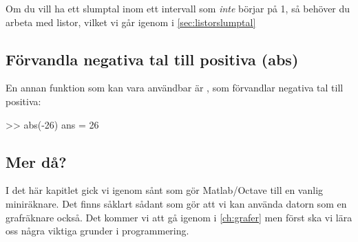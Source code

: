 Om du vill ha ett slumptal inom ett intervall som \emph{inte} börjar på 1, så behöver du arbeta med listor, vilket vi går igenom i \autoref{sec:listorslumptal}
\subsection{Förvandla negativa tal till positiva (abs)}\label{subsec:abs}
En annan funktion som kan vara användbar är , som förvandlar negativa tal till positiva:

\begin{matlab}[caption={abs},label={}]
>> abs(-26) %
ans = 26
\end{matlab}

\subsection{Mer då?}
I det här kapitlet gick vi igenom sånt som gör Matlab/Octave till en vanlig miniräknare. Det finns såklart sådant som gör att vi kan använda datorn som en grafräknare också. Det kommer vi att gå igenom i \autoref{ch:grafer} men först ska vi lära oss några viktiga grunder i programmering.
